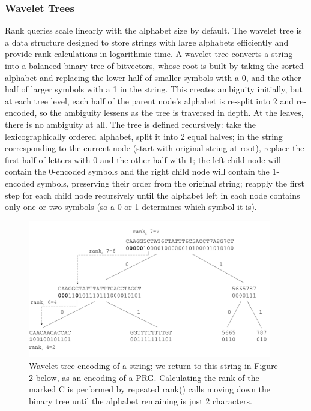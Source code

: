 \documentclass[runningheads,a4paper]{llncs}
\begin{document}
\subsubsection{Wavelet Trees}
Rank queries scale linearly with the alphabet size by default. The wavelet tree is a data structure designed to store strings with large alphabets efficiently and provide rank calculations in logarithmic time. A wavelet tree converts a string into a balanced binary-tree of bitvectors, whose root is built by taking the sorted alphabet and replacing the lower half of smaller symbols with a 0, and the other half of larger symbols with a 1 in the string. This creates ambiguity initially, but at each tree level, each half of the parent node's alphabet is re-split into 2 and re-encoded, so the ambiguity lessens as the tree is traversed in depth. At the leaves, there is no ambiguity at all. The tree is defined recursively: take the lexicographically ordered alphabet, split it into 2 equal halves; in the string corresponding to the current node (start with original string at root), replace the first half of letters with 0 and the other half with 1; the left child node will contain the 0-encoded symbols and the right child node will contain the 1-encoded symbols, preserving their order from the original string; reapply the first step for each child node recursively until the alphabet left in each node contains only one or two symbols (so a 0 or 1 determines which symbol it is).

 \begin{figure}
\centering
\includegraphics[height=6cm]{wavelet_tree.png}
\caption{Wavelet tree encoding of a string; we return to this string in Figure 2 below, as an encoding of a PRG. Calculating the rank of the marked C is performed by repeated rank() calls moving down the binary tree until the alphabet remaining is just 2 characters.}
\label{fig:wt}
\end{figure}
\end{document}
